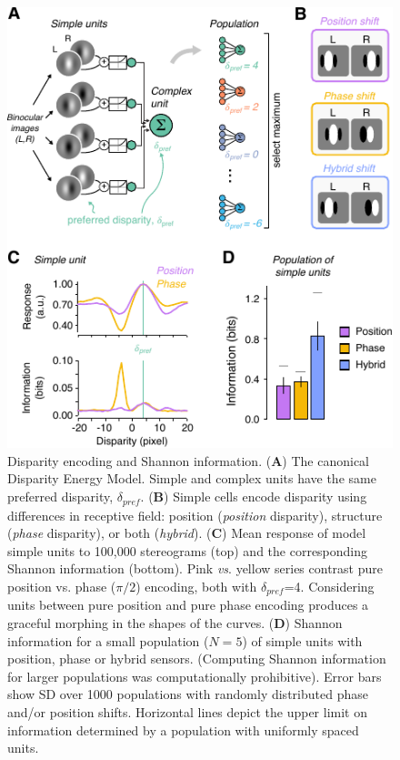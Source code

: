 {\begin{figure}[!h]
  \centering
  \includegraphics{chapter1/chapter1-figs/Fig1.pdf}
  \caption[Disparity encoding and Shannon information.]{Disparity encoding and Shannon information. ({\bf A}) The canonical Disparity Energy Model. Simple and complex units have the same preferred disparity, $\delta_{pref}$. ({\bf B}) Simple cells encode disparity using differences in receptive field: position ({\it position} disparity), structure ({\it phase} disparity), or both ({\it hybrid}). ({\bf C}) Mean response of model simple units to 100,000 stereograms (top) and the corresponding Shannon information (bottom). Pink {\it vs}. yellow series contrast pure position vs. phase ($\pi/2$) encoding, both with $\delta_{pref}$=4. Considering units between pure position and pure phase encoding produces a graceful morphing in the shapes of the curves. ({\bf D}) Shannon information for a small population ($N=5$) of simple units with position, phase or hybrid sensors. (Computing Shannon information for larger populations was computationally prohibitive). Error bars show SD over 1000 populations with randomly distributed phase and/or position shifts. Horizontal lines depict the upper limit on information determined by a population with uniformly spaced units.}
  \label{fig:c1f1}
\end{figure}


}
